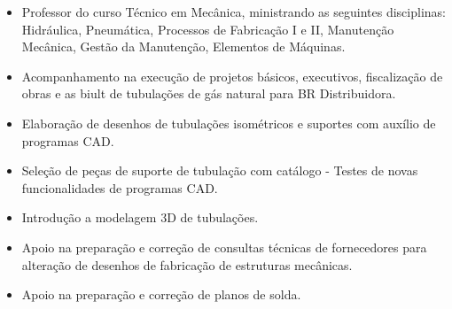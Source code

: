 \documentclass[10pt,a4paper,ragged2e,withhyper]{altacv}
\begin{document}
\begin{paracol}{2}
            \divider
            
            \begin{itemize}
                \item Professor do curso Técnico em Mecânica, ministrando as seguintes disciplinas: \\ Hidráulica, Pneumática, Processos de Fabricação I e II, Manutenção Mecânica, Gestão da Manutenção, Elementos de Máquinas.
            \end{itemize}
            
             \divider
            
            \begin{itemize}
                \item Acompanhamento na execução de projetos básicos, executivos, fiscalização de obras e as biult de tubulações de gás natural para BR Distribuidora.
            \end{itemize}
            
                         \divider
            
            \begin{itemize}
                \item Elaboração de desenhos de tubulações isométricos e suportes com auxílio de programas CAD. 
                \item Seleção de peças de suporte de tubulação com catálogo - Testes de novas funcionalidades de programas CAD. 
                \item Introdução a modelagem 3D de tubulações. 
                \item Apoio na preparação e correção de consultas técnicas de fornecedores para alteração de desenhos de fabricação de estruturas mecânicas. 
                \item Apoio na preparação e correção de planos de solda.
            \end{itemize}
        

\end{paracol}
\end{document}

